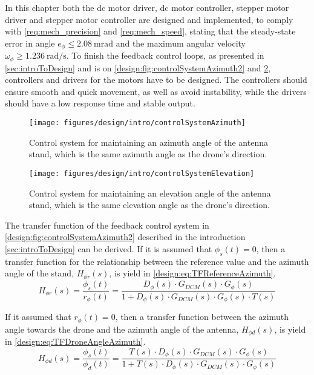 
In this chapter both the \gls{dc} motor driver, \gls{dc} motor controller, stepper motor driver and stepper motor controller are designed and implemented, to comply with \autoref{req:mech_precision} and \autoref{req:mech_speed}, stating that the steady-state error in angle $e_{\phi} \leq \SI{2.08}{\milli\radian}$ and the maximum angular velocity $\omega_\phi \geq \SI{1.236}{\radian\per\second}$. 
To finish the feedback control loops, as presented in \autoref{sec:introToDesign} and is on \autoref{design:fig:controlSystemAzimuth2} and \ref{design:fig:controlSystemElevation2}, controllers and drivers for the motors have to be designed. The controllers should ensure smooth and quick movement, as well as avoid instability, while the drivers should have a low response time and stable output. 

\begin{figure}[!h]
\centering
\texttt{[image: figures/design/intro/controlSystemAzimuth]}
\caption{Control system for maintaining an azimuth angle of the antenna stand, which is the same azimuth angle as the drone's direction.}\label{design:fig:controlSystemAzimuth2}
\end{figure}

\begin{figure}[!h]
\centering
\texttt{[image: figures/design/intro/controlSystemElevation]}
\caption{Control system for maintaining an elevation angle of the antenna stand, which is the same elevation angle as the drone's direction.}\label{design:fig:controlSystemElevation2}
\end{figure}

The transfer function of the feedback control system in \autoref{design:fig:controlSystemAzimuth2} described in the introduction \autoref{sec:introToDesign} can be derived.
If it is assumed that $\phi_s(t) = 0$, then a transfer function for the relationship between the reference value and the azimuth angle of the stand, $H_{\phi r}(s)$, is yield in \autoref{design:eq:TFReferenceAzimuth}.
\begin{equation}
H_{\phi r}(s)=\frac{\phi_s (t)}{r_\phi (t)}=\frac{D_\phi (s)\cdot G_{DCM}(s)\cdot G_\phi (s)}{1+ D_\phi (s)\cdot G_{DCM}(s)\cdot G_\phi (s)\cdot T(s)}\label{design:eq:TFReferenceAzimuth}
\end{equation}

If it assumed that $r_\phi (t)=0$, then a transfer function between the azimuth angle towards the drone and the azimuth angle of the antenna, $H_{\phi d}(s)$, is yield in \autoref{design:eq:TFDroneAngleAzimuth}.
\begin{equation}
H_{\phi d}(s)=\frac{\phi_s (t)}{\phi_d (t)}=\frac{T(s)\cdot D_\phi (s)  \cdot G_{DCM}(s) \cdot G_\phi (s)}{1+T(s) \cdot D_\phi (s) \cdot G_{DCM}(s) \cdot G_\phi (s)} \label{design:eq:TFDroneAngleAzimuth}
\end{equation}

